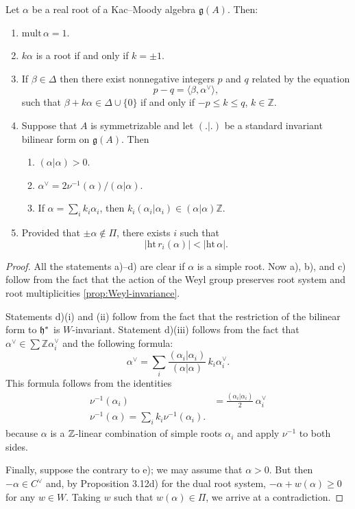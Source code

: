 \documentclass[12pt]{article}
\begin{document}
\begin{proposition}\label{prop:real-roots}
Let $\alpha$ be a real root of a Kac--Moody algebra $\mathfrak{g}(A)$. Then:
\begin{enumerate}[label=\alph*)]
    \item $\mathrm{mult}\,\alpha = 1$.
    \item $k\alpha$ is a root if and only if $k = \pm 1$.
    \item If $\beta \in \Delta$ then there exist nonnegative integers $p$ and $q$ related by the equation
    \[
        p - q = \langle \beta, \alpha^\vee \rangle,
    \]
    such that $\beta + k\alpha \in \Delta \cup \{0\}$ if and only if $-p \leq k \leq q$, $k \in \mathbb{Z}$.
    \item Suppose that $A$ is symmetrizable and let $(.|.)$ be a standard invariant bilinear form on $\mathfrak{g}(A)$. Then
    \begin{enumerate}[label=(\roman*)]
        \item $(\alpha|\alpha) > 0$.
        \item $\alpha^\vee = 2\nu^{-1}(\alpha)/(\alpha|\alpha)$.
        \item If $\alpha = \sum_i k_i \alpha_i$, then $k_i(\alpha_i|\alpha_i) \in (\alpha|\alpha)\mathbb{Z}$.
    \end{enumerate}
    \item Provided that $\pm \alpha \notin \Pi$, there exists $i$ such that
    \[
        |\mathrm{ht}\, r_i(\alpha)| < |\mathrm{ht}\,\alpha|.
    \]
\end{enumerate}
\end{proposition}

\begin{proof}
All the statements a)--d) are clear if $\alpha$ is a simple root. Now a), b), and c) follow from the fact that the action of the Weyl group preserves root system and root multiplicities \ref{prop:Weyl-invariance}.

Statements d)(i) and (ii) follow from the fact that the restriction of the bilinear form to $\mathfrak{h}^*$ is $W$-invariant. Statement d)(iii) follows from the fact that $\alpha^\vee \in \sum \mathbb{Z}\alpha_i^\vee$ and the following formula:
\[
    \alpha^\vee = \sum_i \frac{(\alpha_i|\alpha_i)}{(\alpha|\alpha)}\, k_i \alpha_i^\vee. \tag{5.1.1}
\] This formula follows from the identities \begin{align*}
    \nu^{-1}(\alpha_i) &= \frac{(\alpha_i|\alpha_i)}{2} \, \alpha_i^\vee \\
    \nu^{-1}(\alpha) = \sum_i k_i \nu^{-1}(\alpha_i).
\end{align*} because $\alpha$ is a $\mathbb{Z}$-linear combination of simple roots $\alpha_i$ and apply $\nu^{-1}$ to both sides.

Finally, suppose the contrary to e); we may assume that $\alpha > 0$. But then $-\alpha \in C^\vee$ and, by Proposition 3.12d) for the dual root system, $-\alpha + w(\alpha) \geq 0$ for any $w \in W$. Taking $w$ such that $w(\alpha) \in \Pi$, we arrive at a contradiction.
\end{proof}
\end{document}
